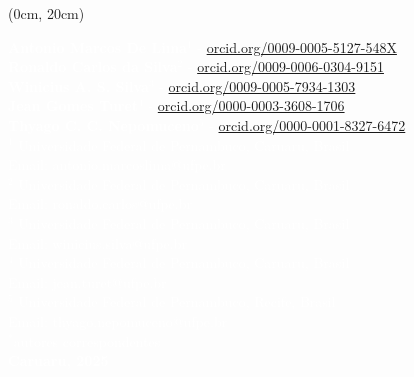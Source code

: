\begin{textblock*}{10.5cm}(0cm, 20cm)

\begin{center}

    
   \textcolor{white}{\textbf{Antonio Marcos De Lima}$^1$ - \href{https://orcid.org/0009-0005-5127-548X}{orcid.org/0009-0005-5127-548X} \\
    \textbf{Ronaldo Carlos da Silva}$^2$ - \href{https://orcid.org/0009-0006-0304-9151}{orcid.org/0009-0006-0304-9151} \\ 
    \textbf{Winicius A. S. Silva}$^3$ - \href{https://orcid.org/0009-0005-7934-1303}{orcid.org/0009-0005-7934-1303}\\
     \textbf{Jean Gomes Turet}$^4$ - \href{https://orcid.org/0000-0003-3608-1706}{orcid.org/0000-0003-3608-1706} \\  
    \textbf{Thyago C. C. Nepomuceno}$^5$ - \href{https://orcid.org/0000-0001-8327-6472}{orcid.org/0000-0001-8327-6472} }\\  

   
    \textcolor{white}{$^1$ Universidade Federal de Pernambuco, Caruaru, Brasil \\ Email: antonio.marcoslima@ufpe.br \\
     $^2$ Universidade Federal de Pernambuco, Caruaru, Brasil \\ Email: ronaldo.carlos@ufpe.br \\
    $^3$ Universidade Federal de Pernambuco, Caruaru, Brasil \\ Email: winicius.silva@ufpe.br \\
    $^4$ Universidade Federal de Pernambuco, Caruaru, Brasil \\ Email: jean.turet@ufpe.br\\
    $^5$ Universidade Federal de Pernambuco, Recife, Brasil \\ Email: thyago.nepomuceno@ufpe.br \\
    $^*$autores correspondentes}\\
    \vspace{0.2cm}
    \textcolor{white}{\textbf{Caruaru, 2025}}
    

\end{center}

\end{textblock*}